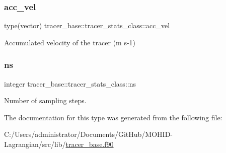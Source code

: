 \subsubsection{\texorpdfstring{acc\+\_\+vel}{acc\_vel}}
{\footnotesize\ttfamily type(vector) tracer\+\_\+base\+::tracer\+\_\+stats\+\_\+class\+::acc\+\_\+vel\hspace{0.3cm}{\ttfamily [private]}}



Accumulated velocity of the tracer (m s-\/1) 

\mbox{\label{structtracer__base_1_1tracer__stats__class_a77e72ef1bc36c7b337f2d1b199010e81}} 
\subsubsection{\texorpdfstring{ns}{ns}}
{\footnotesize\ttfamily integer tracer\+\_\+base\+::tracer\+\_\+stats\+\_\+class\+::ns\hspace{0.3cm}{\ttfamily [private]}}



Number of sampling steps. 



The documentation for this type was generated from the following file\+:\begin{DoxyCompactItemize}
\item 
C\+:/\+Users/administrator/\+Documents/\+Git\+Hub/\+M\+O\+H\+I\+D-\/\+Lagrangian/src/lib/\mbox{\hyperlink{tracer__base_8f90}{tracer\+\_\+base.\+f90}}\end{DoxyCompactItemize}
